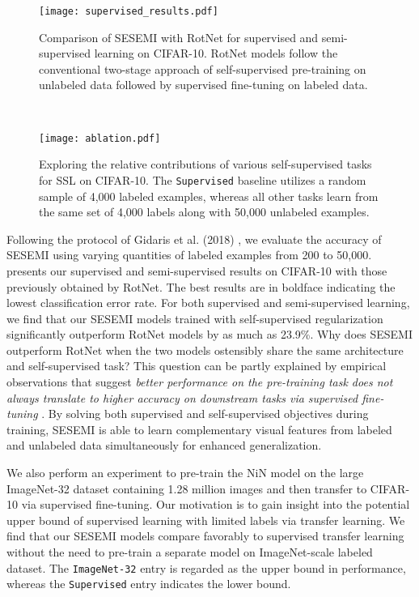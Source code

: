 \documentclass{article}
\begin{document}
\begin{figure}[t]
    \centering
    \begin{minipage}[t]{0.49\textwidth}
        \centering
        \texttt{[image: supervised\_results.pdf]}
        \caption{Comparison of SESEMI with RotNet for supervised and semi-supervised learning on CIFAR-10. RotNet models follow the conventional two-stage approach of self-supervised pre-training on unlabeled data followed by supervised fine-tuning on labeled data.}
        \label{figure2}
    \end{minipage}~~~~
    \begin{minipage}[t]{0.49\textwidth}
        \centering
        \texttt{[image: ablation.pdf]}
        \caption{Exploring the relative contributions of various self-supervised tasks for SSL on CIFAR-10. The \texttt{Supervised} baseline utilizes a random sample of 4,000 labeled examples, whereas all other tasks learn from the same set of 4,000 labels along with 50,000 unlabeled examples.}
        \label{figure3}
    \end{minipage}
\end{figure}

Following the protocol of Gidaris et al. (2018) \cite{rotations}, we evaluate the accuracy of SESEMI using varying quantities of labeled examples from 200 to 50,000.  presents our supervised and semi-supervised results on CIFAR-10 with those previously obtained by RotNet. The best results are in boldface indicating the lowest classification error rate. For both supervised and semi-supervised learning, we find that our SESEMI models trained with self-supervised regularization significantly outperform RotNet models by as much as 23.9\%. Why does SESEMI outperform RotNet when the two models ostensibly share the same architecture and self-supervised task? This question can be partly explained by empirical observations that suggest \emph{better performance on the pre-training task does not always translate to higher accuracy on downstream tasks via supervised fine-tuning} \cite{revisit-ssl}. By solving both supervised and self-supervised objectives during training, SESEMI is able to learn complementary visual features from labeled and unlabeled data simultaneously for enhanced generalization.

We also perform an experiment to pre-train the NiN model on the large ImageNet-32 dataset containing 1.28 million images and then transfer to CIFAR-10 via supervised fine-tuning. Our motivation is to gain insight into the potential upper bound of supervised learning with limited labels via transfer learning. We find that our SESEMI models compare favorably to supervised transfer learning without the need to pre-train a separate model on ImageNet-scale labeled dataset. The \texttt{ImageNet-32} entry is regarded as the upper bound in performance, whereas the \texttt{Supervised} entry indicates the lower bound.
\end{document}
